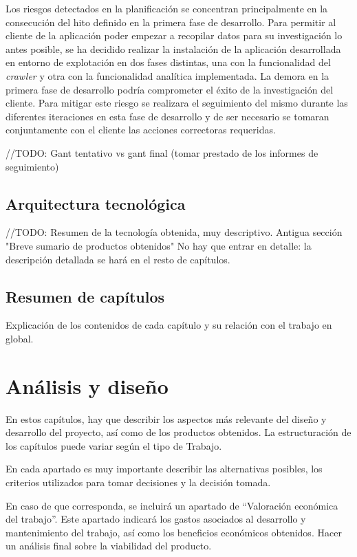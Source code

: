 \documentclass[11pt,a4paper]{article}
\begin{document}
Los riesgos detectados en la planificación se concentran principalmente en la consecución del hito definido en la primera fase de desarrollo. Para permitir al cliente de la aplicación poder empezar a recopilar datos para su investigación lo antes posible, se ha decidido realizar la instalación de la aplicación desarrollada en entorno de explotación en dos fases distintas, una con la funcionalidad del \textit{crawler} y otra con la funcionalidad analítica implementada. La demora en la primera fase de desarrollo podría comprometer el éxito de la investigación del cliente. Para mitigar este riesgo se realizara el seguimiento del mismo durante las diferentes iteraciones en esta fase de desarrollo y de ser necesario se tomaran conjuntamente con el cliente las acciones correctoras requeridas. 


//TODO: Gant tentativo vs gant final (tomar prestado de los informes de seguimiento)


\subsection{Arquitectura tecnológica}
//TODO: Resumen de la tecnología obtenida, muy descriptivo. Antigua sección "Breve sumario de productos obtenidos"
No hay que entrar en detalle: la descripción detallada se hará en el resto de capítulos. 


\subsection{Resumen de capítulos}
Explicación de los contenidos de cada capítulo y su relación con el trabajo en global.
\newpage 



\section{Análisis y diseño}
En estos capítulos, hay que describir los aspectos más relevante del diseño y desarrollo del proyecto, así como de los productos obtenidos. La estructuración de los capítulos puede variar según el tipo de Trabajo.  

En cada apartado es muy importante describir las alternativas posibles, los criterios utilizados para tomar decisiones y la decisión tomada.

En caso de que corresponda, se incluirá un apartado de “Valoración económica del trabajo”. Este apartado indicará los gastos asociados al desarrollo y mantenimiento del trabajo, así como los beneficios económicos obtenidos. Hacer un análisis final sobre la viabilidad del producto. 
\end{document}
